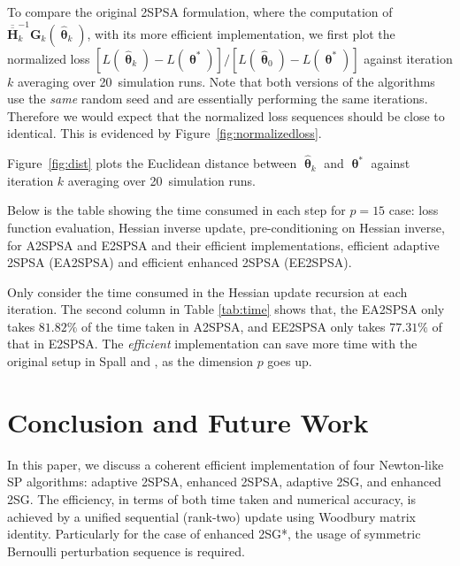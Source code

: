 \documentclass[conference]{IEEEtran}
\newcommand{\bG}{\bm{G}}
\newcommand{\ooH}{\bm{\overline{\overline{H}}}}
\newcommand{\htheta}{\bm{\hat{\uptheta}}}
\begin{document}
\newcommand{\nruns}[0]{20\ }
To compare the original 2SPSA formulation, where the computation of $\ooH_k^{-1}
\bG_k(\htheta_k)$, with its more efficient
implementation, we first plot the normalized loss
$[L(\htheta_k)-L(\bm{\uptheta}^{*})]/[L(\htheta_0)-L(\bm{\uptheta}^{*})]$
against iteration $k$ averaging over \nruns simulation runs. Note that
both versions of the algorithms use the \textit{same} random seed and
are essentially performing the same iterations. Therefore we would expect
that the normalized loss sequences should be close to identical. This is evidenced by Figure~\ref{fig:normalizedloss}.

Figure~\ref{fig:dist} plots the Euclidean distance between
$\htheta_k$ and $\bm{\uptheta}^{*}$ against iteration $k$ averaging
over \nruns simulation runs.


Below is the table showing the time consumed in each step for $p=15$ case:
loss function evaluation, Hessian inverse update, pre-conditioning on
Hessian inverse, for A2SPSA and E2SPSA and their efficient implementations, efficient adaptive 2SPSA (EA2SPSA) and efficient enhanced 2SPSA (EE2SPSA).

\begin{table}[htbp]
	\centering
		\caption{Time Consumed in Each Procedure}
		\label{tab:time}
	\end{table}

Only consider the time consumed in the Hessian update recursion at each iteration. The second column in Table \ref{tab:time} shows that, the EA2SPSA only takes $81.82\%$ of the time taken in A2SPSA, and EE2SPSA only takes $77.31\%$ of that in E2SPSA. The \textit{efficient} implementation can save more time with the original setup in Spall \cite{Spall2000} and \cite{Spall2009}, as the dimension $p$ goes up. 


\section{Conclusion and Future Work} In this paper, we discuss
a coherent efficient implementation of four Newton-like SP algorithms:
adaptive 2SPSA, enhanced 2SPSA, adaptive 2SG, and enhanced 2SG. The
efficiency, in terms of both time taken and numerical accuracy, is
achieved by a unified sequential (rank-two) update using Woodbury
matrix identity. Particularly for the case of enhanced 2SG*, the
usage of symmetric Bernoulli perturbation sequence is required.
\end{document}
